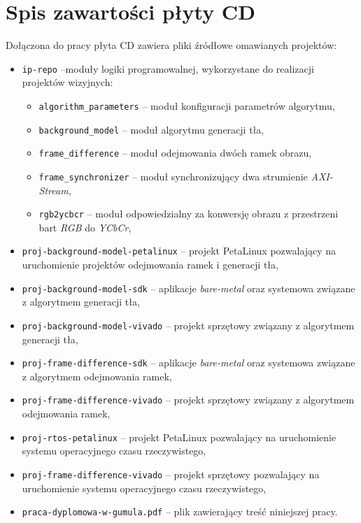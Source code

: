\section{Spis zawartości płyty CD}

Dołączona do pracy płyta CD zawiera pliki źródłowe omawianych projektów:
\begin{itemize}
	\item \texttt{ip-repo} --moduły logiki programowalnej, wykorzystane do realizacji projektów wizyjnych:
	\begin{itemize}
		\item \texttt{algorithm\_parameters} -- moduł konfiguracji parametrów algorytmu,
		\item \texttt{background\_model} -- moduł algorytmu generacji tła,
		\item \texttt{frame\_difference} -- moduł odejmowania dwóch ramek obrazu,
		\item \texttt{frame\_synchronizer} -- moduł synchronizujący dwa strumienie \emph{AXI-Stream},
		\item \texttt{rgb2ycbcr} -- moduł odpowiedzialny za konwersję obrazu z przestrzeni bart \emph{RGB} do \emph{YCbCr},
	\end{itemize}
	
	\item \texttt{proj-background-model-petalinux} -- projekt PetaLinux pozwalający na uruchomienie projektów odejmowania ramek i generacji tła,
	\item \texttt{proj-background-model-sdk} -- aplikacje \emph{bare-metal} oraz systemowa związane z algorytmem generacji tła,
	
	\item \texttt{proj-background-model-vivado} -- projekt sprzętowy związany z algorytmem generacji tła,
		
	\item \texttt{proj-frame-difference-sdk} -- aplikacje \emph{bare-metal} oraz systemowa związane z algorytmem odejmowania ramek,
	
	\item \texttt{proj-frame-difference-vivado} -- projekt sprzętowy związany z algorytmem odejmowania ramek,
	
	\item \texttt{proj-rtos-petalinux} -- projekt PetaLinux pozwalający na uruchomienie systemu operacyjnego czasu rzeczywistego,
	
	\item \texttt{proj-frame-difference-vivado} -- projekt sprzętowy pozwalający na uruchomienie systemu operacyjnego czasu rzeczywistego,
	
	\item \texttt{praca-dyplomowa-w-gumula.pdf} -- plik zawierający treść niniejszej pracy.
\end{itemize}
